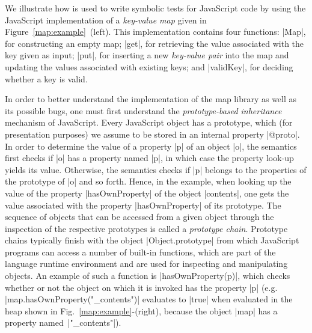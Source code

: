 

We illustrate how \jilette is used to write symbolic tests for JavaScript code by using the JavaScript implementation 
of a  \emph{key-value map} given in Figure~\ref{map:example}~(left). 
This implementation contains four functions: 
\jsinline|Map|, for constructing an empty map;
\jsinline|get|, for retrieving the value associated with the key given as input;
\jsinline|put|, for inserting a new \emph{key-value pair} into the map and updating the values associated with existing keys; and
\jsinline|validKey|, for deciding whether a key is valid.

In order to better understand the implementation of the map library as well as its possible bugs, 
one must first understand the \emph{prototype-based inheritance} mechanism of JavaScript. 
Every JavaScript object has a prototype, which (for presentation purposes) we assume to 
be stored  in an internal property \jsinline|@proto|. In order to determine the value of a property
\jsinline|p| of an object \jsinline|o|, the semantics first checks if \jsinline|o| has a 
property named \jsinline|p|, in which case the property look-up yields its value. Otherwise, the 
semantics checks if \jsinline|p| belongs to the properties of the prototype of \jsinline|o| and so 
forth. Hence, in the example, when looking up the value of the property \jsinline|hasOwnProperty|
of the object \jsinline|contents|, one gets the value associated with the property  \jsinline|hasOwnProperty|
of its prototype.
The sequence of objects that can be accessed from a given object through the inspection 
of the respective prototypes is called a \emph{prototype chain}.
Prototype chains typically finish with the object \jsinline|Object.prototype| from which JavaScript 
programs can access a number of built-in functions, which are part of the language runtime environment and are used for inspecting and manipulating objects.
An example of such a function is \jsinline|hasOwnProperty(p)|, which checks whether or not the object 
on which it is invoked has the property \jsinline|p| (e.g. {\small \jsinline|map.hasOwnProperty("_contents")|}
evaluates to \jsinline|true| when evaluated in the heap shown in Fig.~\ref{map:example}-(right), 
because the object \jsinline|map| has a property named~\jsinline|"_contents"|). 

